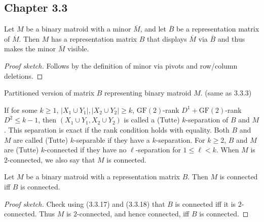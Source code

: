 \subsection{Chapter 3.3}

\begin{lemma}[3.3.12]
  \label{lem:3.3.12}
  Let $M$ be a binary matroid with a minor $\overline{M}$, and let $\overline{B}$ be a representation matrix of $\overline{M}$. Then $M$ has a representation matrix $B$ that displays $\overline{M}$ via $\overline{B}$ and thus makes the minor $\overline{M}$ visible.
\end{lemma}

\begin{proof}[Proof sketch]
  Follows by the definition of minor via pivots and row/column deletions.
\end{proof}

\begin{proposition}[3.3.17]
  \label{prop:3.3.17}
  Partitioned version of matrix $B$ representing binary matroid $M$. (same as 3.3.3)
\end{proposition}

\begin{proposition}[3.3.18] %
  \label{prop:3.3.18}
  If for some $k \geq 1$, $|X_{1} \cup Y_{1}|, |X_{2} \cup Y_{2}| \geq k$, $\mathrm{GF}(2)$-rank $D^{1} + \mathrm{GF}(2)$-rank $D^{2} \leq k - 1$, then $(X_{1} \cup Y_{1}, X_{2} \cup Y_{2})$ is called a (Tutte) $k$-separation of $B$ and $M$. This separation is exact if the rank condition holds with equality. Both $B$ and $M$ are called (Tutte) $k$-separable if they have a $k$-separation. For $k \geq 2$, $B$ and $M$ are (Tutte) $k$-connected if they have no $\ell$-separation for $1 \leq \ell < k$. When $M$ is $2$-connected, we also say that $M$ is connected.
\end{proposition}

\begin{lemma}[3.3.19]
  \label{lem:3.3.19}
  Let $M$ be a binary matroid with a representation matrix $B$. Then $M$ is connected iff $B$ is connected.
\end{lemma}

\begin{proof}[Proof sketch]
  Check using (3.3.17) and (3.3.18) that $B$ is connected iff it is $2$-connected. Thus $M$ is $2$-connected, and hence connected, iff $B$ is connected.
\end{proof}

